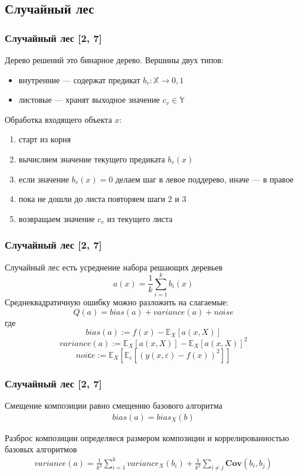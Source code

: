 \documentclass{beamer}
\newcommand{\COV}[2]{\textbf{Cov}\left(#1, #2\right)}
\renewcommand{\epsilon}{\varepsilon}
\begin{document}
\subsection{Случайный лес}

\begin{frame}
    \frametitle{Случайный лес [2, 7]}

    Дерево решений это бинарное дерево.
    Вершины двух типов:
    \begin{itemize}
        \item внутренние --- содержат предикат $b_v: \mathbb{X} \rightarrow {0, 1}$
        \item листовые --- хранят выходное значение $c_v \in \mathbb{Y}$
    \end{itemize}

    Обработка входящего объекта $x$:
    \begin{enumerate}
        \item старт из корня
        \item вычисляем значение текущего предиката $b_v(x)$
        \item если значение $b_v(x) = 0$ делаем шаг в левое поддерево, иначе --- в правое
        \item пока не дошли до листа повторяем шаги 2 и 3
        \item возвращаем значение $c_v$ из текущего листа
    \end{enumerate}
\end{frame}

\begin{frame}
    \frametitle{Случайный лес [2, 7]}

    Случайный лес есть усреднение набора решающих деревьев
    \[
        a(x) = \frac{1}{k} \sum_{i=1}^{k} b_i(x)
    \]
    Среднеквадратичную ошибку можно разложить на слагаемые:
    \[
        Q(a) = bias(a) + variance(a) + noise
    \]
    где 
    \[
        bias(a) := f(x) - \mathbb{E}_X\left[a(x, X)\right]
    \]
    \[
        variance(a) := \mathbb{E}_X\left[a(x, X)\right] -\mathbb{E}_X\left[a(x, X)\right]^2
    \]
    \[
        noiсe := \mathbb{E}_X\left[\mathbb{E}_{\epsilon}\left[\left( y(x, \epsilon) - f(x) \right)^2\right]\right]
    \]
\end{frame}

\begin{frame}
    \frametitle{Случайный лес [2, 7]}

    Смещение композиции равно смещению базового алгоритма
    \begin{align*}
        bias(a) = bias_X(b)
    \end{align*}
    
    Разброс композиции определяеся размером композиции и коррелированностью базовых алгоритмов
    \begin{align*}
    	variance(a) =
         \frac{1}{k^2} \sum_{i=1}^{k} variance_X(b_i) + 
        \frac{1}{k^2} \sum_{i \ne j} \COV{b_i}{b_j}
    \end{align*}

\end{frame}
\end{document}
